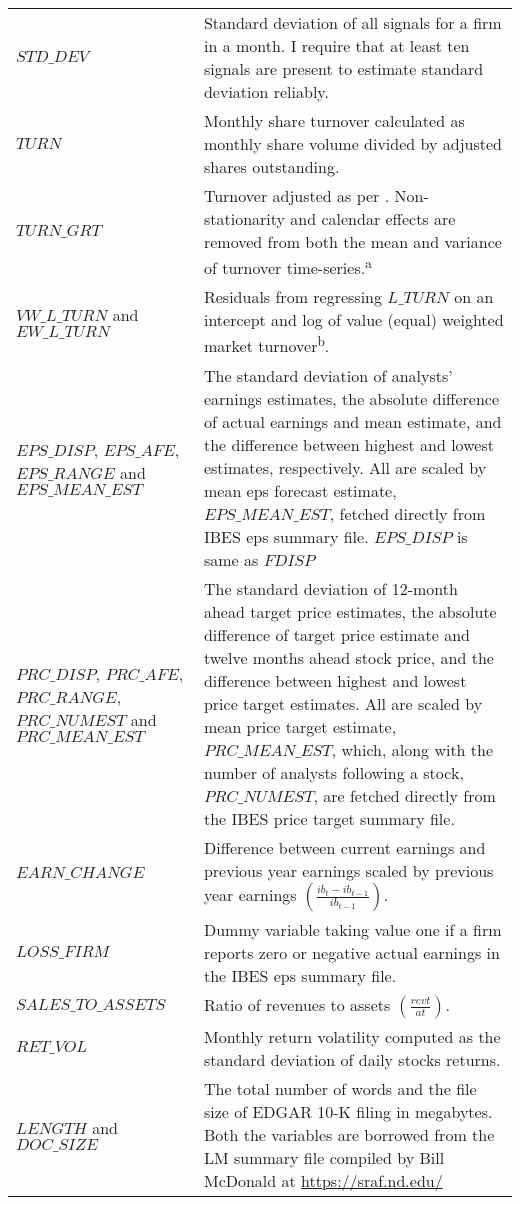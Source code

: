 \begin{landscape}
\begin{ThreePartTable}
\begin{spacing}{1.0}
\begin{longtable}[t]{>{\raggedright\arraybackslash}p{5.2cm}>{\raggedright\arraybackslash}p{15.6cm}}
\addlinespace
$STD\_DEV$ & Standard deviation of all signals for a firm in a month. I require that at least ten signals are present to estimate standard deviation reliably.\\
\addlinespace
$TURN$ & Monthly share turnover calculated as monthly share volume divided by adjusted shares outstanding.\\
\addlinespace
$TURN\_GRT$ & Turnover adjusted as per \cite{grt1992}. Non-stationarity and calendar effects are removed from both the mean and variance of turnover time-series.\textsuperscript{a}\\
\addlinespace
$VW\_L\_TURN$ and $EW\_L\_TURN$ & Residuals from regressing $L\_TURN$ on an intercept and log of value (equal) weighted market turnover\textsuperscript{b}.\\
\addlinespace
$EPS\_DISP$, $EPS\_AFE$, $EPS\_RANGE$ and $EPS\_MEAN\_EST$ & The standard deviation of analysts' earnings estimates, the absolute difference of actual earnings and mean estimate, and the difference between highest and lowest estimates, respectively. All are scaled by mean eps forecast estimate, $EPS\_MEAN\_EST$, fetched directly from IBES eps summary file. $EPS\_DISP$ is same as $FDISP$\\
\addlinespace
$PRC\_DISP$, $PRC\_AFE$, $PRC\_RANGE$, $PRC\_NUMEST$ and $PRC\_MEAN\_EST$ & The standard deviation of 12-month ahead target price estimates, the absolute difference of target price estimate and twelve months ahead stock price, and the difference between highest and lowest price target estimates. All are scaled by mean price target estimate, $PRC\_MEAN\_EST$, which, along with the number of analysts following a stock, $PRC\_NUMEST$, are fetched directly from the IBES price target summary file.\\
\addlinespace
$EARN\_CHANGE$ & Difference between current earnings and previous year earnings scaled by previous year earnings $\left( \frac{ib_t - ib_{t-1}}{ib_{t-1}} \right)$.\\
\addlinespace
$LOSS\_FIRM$ & Dummy variable taking value one if a firm reports zero or negative actual earnings in the IBES eps summary file.\\
\addlinespace
$SALES\_TO\_ASSETS$ & Ratio of revenues to assets $\left( \frac{revt}{at} \right)$.\\
\addlinespace
$RET\_VOL$ & Monthly return volatility computed as the standard deviation of daily stocks returns.\\
\addlinespace
$LENGTH$ and $DOC\_SIZE$ & The total number of words and the file size of EDGAR 10-K filing in megabytes. Both the variables are borrowed from the LM summary file compiled by Bill McDonald at \url{https://sraf.nd.edu/}\\

\end{longtable}
\end{spacing}
\end{ThreePartTable}
\end{landscape}
